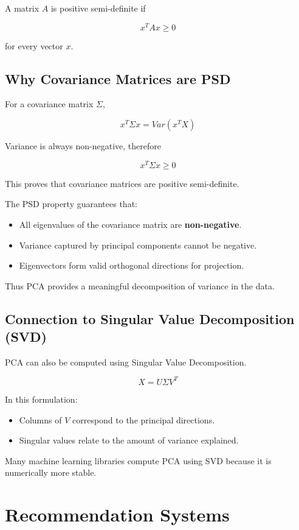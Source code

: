 \documentclass[10pt,a4paper]{article}
\begin{document}
	A matrix $A$ is positive semi-definite if

	\[
	x^T A x \ge 0
	\]

	for every vector $x$.

	\subsection{Why Covariance Matrices are PSD}

	For a covariance matrix $\Sigma$,

	\[
	x^T \Sigma x = Var(x^T X)
	\]

	Variance is always non-negative, therefore

	\[
	x^T \Sigma x \ge 0
	\]

	This proves that covariance matrices are positive semi-definite.

	The PSD property guarantees that:

	\begin{itemize}
		\item All eigenvalues of the covariance matrix are \textbf{non-negative}.
		\item Variance captured by principal components cannot be negative.
		\item Eigenvectors form valid orthogonal directions for projection.
	\end{itemize}

	Thus PCA provides a meaningful decomposition of variance in the data.

	\subsection{Connection to Singular Value Decomposition (SVD)}

	PCA can also be computed using Singular Value Decomposition.

	\[
	X = U \Sigma V^T
	\]

	In this formulation:

	\begin{itemize}
		\item Columns of $V$ correspond to the principal directions.
		\item Singular values relate to the amount of variance explained.
	\end{itemize}

	Many machine learning libraries compute PCA using SVD because it is numerically more stable.


	\section{Recommendation Systems}
\end{document}
